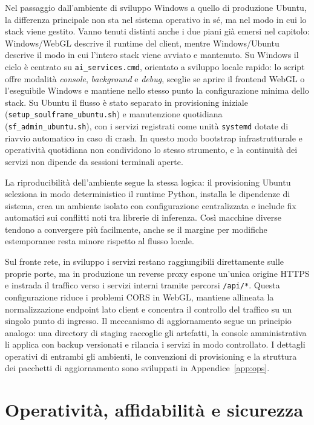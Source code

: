 Nel passaggio dall'ambiente di sviluppo Windows a quello di produzione Ubuntu, la differenza principale non sta nel sistema operativo in sé, ma nel modo in cui lo stack viene gestito. Vanno tenuti distinti anche i due piani già emersi nel capitolo: Windows/WebGL descrive il runtime del client, mentre Windows/Ubuntu descrive il modo in cui l'intero stack viene avviato e mantenuto. Su Windows il ciclo è centrato su \texttt{ai\_services.cmd}, orientato a sviluppo locale rapido: lo script offre modalità \emph{console}, \emph{background} e \emph{debug}, sceglie se aprire il frontend WebGL o l'eseguibile Windows e mantiene nello stesso punto la configurazione minima dello stack. Su Ubuntu il flusso è stato separato in provisioning iniziale (\texttt{setup\_soulframe\_ubuntu.sh}) e manutenzione quotidiana (\texttt{sf\_admin\_ubuntu.sh}), con i servizi registrati come unità \texttt{systemd} dotate di riavvio automatico in caso di crash. In questo modo bootstrap infrastrutturale e operatività quotidiana non condividono lo stesso strumento, e la continuità dei servizi non dipende da sessioni terminali aperte.

La riproducibilità dell'ambiente segue la stessa logica: il provisioning Ubuntu seleziona in modo deterministico il runtime Python, installa le dipendenze di sistema, crea un ambiente isolato con configurazione centralizzata e include fix automatici sui conflitti noti tra librerie di inferenza. Così macchine diverse tendono a convergere più facilmente, anche se il margine per modifiche estemporanee resta minore rispetto al flusso locale.

Sul fronte rete, in sviluppo i servizi restano raggiungibili direttamente sulle proprie porte, ma in produzione un reverse proxy espone un'unica origine HTTPS e instrada il traffico verso i servizi interni tramite percorsi \texttt{/api/*}. Questa configurazione riduce i problemi CORS in WebGL, mantiene allineata la normalizzazione endpoint lato client e concentra il controllo del traffico su un singolo punto di ingresso. Il meccanismo di aggiornamento segue un principio analogo: una directory di staging raccoglie gli artefatti, la console amministrativa li applica con backup versionati e rilancia i servizi in modo controllato. I dettagli operativi di entrambi gli ambienti, le convenzioni di provisioning e la struttura dei pacchetti di aggiornamento sono sviluppati in Appendice~\ref{app:ops}.
\endgroup

\begingroup
\setlength{\emergencystretch}{3em}
\hfuzz=200pt
\sloppy
\section{Operatività, affidabilità e sicurezza}\label{sec:runbook}\label{sec:sicurezza}

